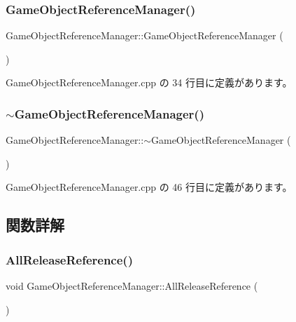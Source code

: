\subsubsection{\texorpdfstring{Game\+Object\+Reference\+Manager()}{GameObjectReferenceManager()}}
{\footnotesize\ttfamily Game\+Object\+Reference\+Manager\+::\+Game\+Object\+Reference\+Manager (\begin{DoxyParamCaption}{ }\end{DoxyParamCaption})}



 Game\+Object\+Reference\+Manager.\+cpp の 34 行目に定義があります。

\mbox{\label{class_game_object_reference_manager_a9ed62220afb840cdc3e8cbe4bbc3a19e}} 
\subsubsection{\texorpdfstring{$\sim$\+Game\+Object\+Reference\+Manager()}{~GameObjectReferenceManager()}}
{\footnotesize\ttfamily Game\+Object\+Reference\+Manager\+::$\sim$\+Game\+Object\+Reference\+Manager (\begin{DoxyParamCaption}{ }\end{DoxyParamCaption})}



 Game\+Object\+Reference\+Manager.\+cpp の 46 行目に定義があります。



\subsection{関数詳解}
\mbox{\label{class_game_object_reference_manager_ac4852ddd6d8bd5e1f13284ba6204e221}} 
\subsubsection{\texorpdfstring{All\+Release\+Reference()}{AllReleaseReference()}}
{\footnotesize\ttfamily void Game\+Object\+Reference\+Manager\+::\+All\+Release\+Reference (\begin{DoxyParamCaption}{ }\end{DoxyParamCaption})}



